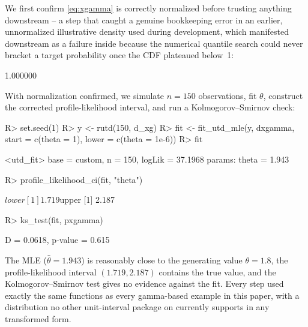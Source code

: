 \documentclass[article]{jss}
\begin{document}
We first confirm \eqref{eq:xgamma} is correctly normalized before trusting anything downstream -- a step that caught a genuine bookkeeping error in an earlier, unnormalized illustrative density used during development, which manifested downstream as a  failure inside  because the numerical quantile search could never bracket a target probability once the CDF plateaued below~1:

\begin{CodeChunk}
\begin{CodeInput}
[1] 1.000000
\end{CodeInput}
\end{CodeChunk}

With normalization confirmed, we simulate $n=150$ observations, fit $\theta$, construct the corrected profile-likelihood interval, and run a Kolmogorov--Smirnov check:

\begin{CodeInput}
R> set.seed(1)
R> y <- rutd(150, d_xg)
R> fit <- fit_utd_mle(y, dxgamma, start = c(theta = 1), lower = c(theta = 1e-6))
R> fit
\end{CodeInput}
\begin{CodeChunk}
\begin{CodeInput}
<utd_fit> base = custom, n = 150, logLik = 37.1968
params: theta = 1.943
\end{CodeInput}
\end{CodeChunk}
\begin{CodeInput}
R> profile_likelihood_ci(fit, "theta")
\end{CodeInput}
\begin{CodeChunk}
\begin{CodeInput}
$lower [1] 1.719   $upper [1] 2.187
\end{CodeInput}
\end{CodeChunk}
\begin{CodeInput}
R> ks_test(fit, pxgamma)
\end{CodeInput}
\begin{CodeChunk}
\begin{CodeInput}
D = 0.0618, p-value = 0.615
\end{CodeInput}
\end{CodeChunk}

The MLE ($\hat{}$) is reasonably close to the generating value $$, the profile-likelihood interval $(1.719,2.187)$ contains the true value, and the Kolmogorov--Smirnov test gives no evidence against the fit. Every step used exactly the same functions as every gamma-based example in this paper, with a distribution no other unit-interval package on  currently supports in any transformed form.
\end{document}
